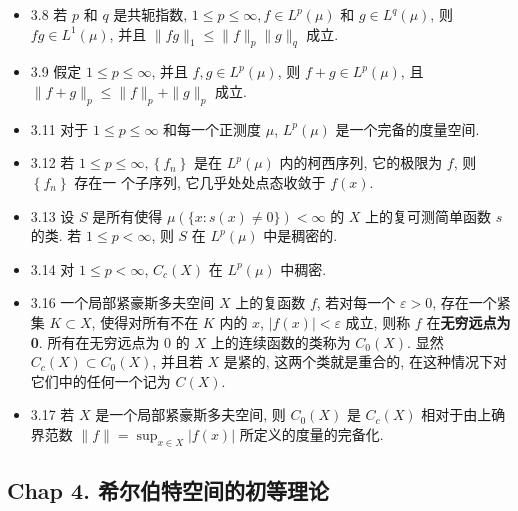 \begin{itemize}
\item 3.8 若 $p$ 和 $q$ 是共轭指数, $1 \leqslant p \leqslant \infty, f \in L^{p}(\mu)$ 和 $g \in L^{q}(\mu)$, 则 $f g \in L^{1}(\mu)$, 并且 $\|f g\|_{1} \leqslant\|f\|_{p}\|g\|_{q}$ 成立.

\item 3.9 假定 $1 \leqslant p \leqslant \infty$, 并且 $f, g \in L^{p}(\mu)$, 则 $f+g \in L^{p}(\mu)$, 且 $\|f+g\|_{p} \leqslant\|f\|_{p}+\|g\|_{p}$ 成立.

\item 3.11 对于 $1 \leqslant p \leqslant \infty$ 和每一个正测度 $\mu$, $L^{p}(\mu)$ 是一个完备的度量空间.

\item 3.12 若 $1 \leqslant p \leqslant \infty,\left\{f_{n}\right\}$ 是在 $L^{p}(\mu)$ 内的柯西序列, 它的极限为 $f$, 则 $\left\{f_{n}\right\}$ 存在一 个子序列, 它几乎处处点态收敛于 $f(x)$.

\item 3.13 设 $S$ 是所有使得 $\mu(\{x: s(x) \neq 0\})<\infty$ 的 $X$ 上的复可测简单函数 $s$ 的类. 若 $1 \leqslant p<\infty$, 则 $S$ 在 $L^{p}(\mu)$ 中是稠密的.

\item 3.14 对 $1 \leqslant p<\infty$, $C_{c}(X)$ 在 $L^{p}(\mu)$ 中稠密.

\item 3.16 一个局部紧豪斯多夫空间 $X$ 上的复函数 $f$, 若对每一个 $\varepsilon>0$, 存在一个紧集 $K \subset X$, 使得对所有不在 $K$ 内的 $x$, $|f(x)|<\varepsilon$ 成立, 则称 $f$ 在\textbf{无穷远点为 0}. 所有在无穷远点为 0 的 $X$ 上的连续函数的类称为 $C_{0}(X)$. 显然 $C_{c}(X) \subset C_{0}(X)$, 并且若 $X$ 是紧的, 这两个类就是重合的, 在这种情况下对它们中的任何一个记为 $C(X)$.

\item 3.17 若 $X$ 是一个局部紧豪斯多夫空间, 则 $C_{0}(X)$ 是 $C_{c}(X)$ 相对于由上确界范数 $\|f\|=\sup _{x \in X}|f(x)|$ 所定义的度量的完备化.
\end{itemize}

\subsection{Chap 4. 希尔伯特空间的初等理论}

